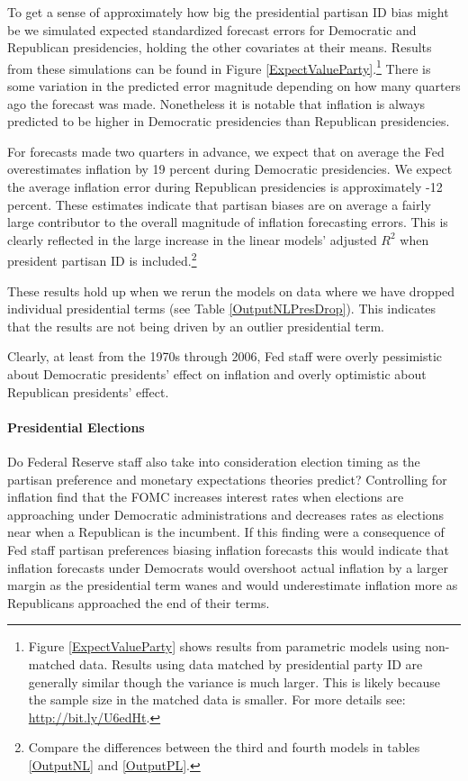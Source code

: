 \documentclass[a4paper]{article}\usepackage{graphicx, color}
\begin{document}
To get a sense of approximately how big the presidential partisan ID bias might be we simulated expected standardized forecast errors for Democratic and Republican presidencies, holding the other covariates at their means. Results from these simulations can be found in Figure \ref{ExpectValueParty}.\footnote{Figure \ref{ExpectValueParty} shows results from parametric models using non-matched data. Results using data matched by presidential party ID are generally similar though the variance is much larger. This is likely because the sample size in the matched data is smaller. For more details see: \url{http://bit.ly/U6edHt}.} There is some variation in the predicted error magnitude depending on how many quarters ago the forecast was made. Nonetheless it is notable that inflation is always predicted to be higher in Democratic presidencies than Republican presidencies.

For forecasts made two quarters in advance, we expect that on average the Fed overestimates inflation by 19 percent during Democratic presidencies. We expect the average inflation error during Republican presidencies is approximately -12 percent. These estimates indicate that partisan biases are on average a fairly large contributor to the overall magnitude of inflation forecasting errors. This is clearly reflected in the large increase in the linear models' adjusted $R^{2}$ when president partisan ID is included.\footnote{Compare the differences between the third and fourth models in tables \ref{OutputNL} and \ref{OutputPL}.} 

These results hold up when we rerun the models on data where we have dropped individual presidential terms (see Table \ref{OutputNLPresDrop}). This indicates that the results are not being driven by an outlier presidential term. 

Clearly, at least from the 1970s through 2006, Fed staff were overly pessimistic about Democratic presidents' effect on inflation and overly optimistic about Republican presidents' effect. 

\paragraph{Presidential Elections}

Do Federal Reserve staff also take into consideration election timing as the partisan preference and monetary expectations theories predict?  Controlling for inflation \cite{Clark2012} find that the FOMC increases interest rates when elections are approaching under Democratic administrations and decreases rates as elections near when a Republican is the incumbent. If this finding were a consequence of Fed staff partisan preferences biasing inflation forecasts this would indicate that inflation forecasts under Democrats would overshoot actual inflation by a larger margin as the presidential term wanes and would underestimate inflation more as Republicans approached the end of their terms.  
\end{document}
